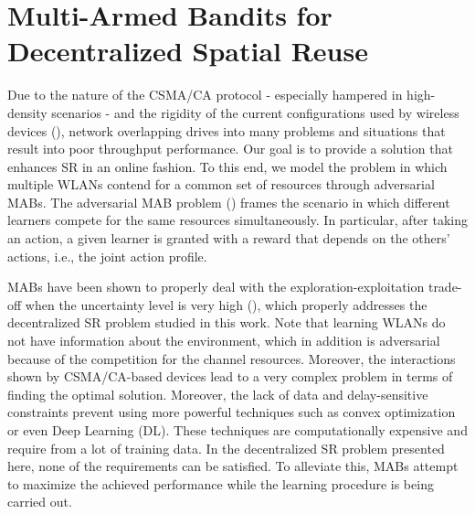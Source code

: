 \documentclass[preprint,12pt]{elsarticle}
\begin{document}
\section{Multi-Armed Bandits for Decentralized Spatial Reuse}
\label{section:mabs}
Due to the nature of the CSMA/CA protocol - especially hampered in high-density scenarios - and the rigidity of the current configurations used by wireless devices (\citealp{akella2007self}), network overlapping drives into many problems and situations that result into poor throughput performance. Our goal is to provide a solution that enhances SR in an online fashion. To this end, we model the problem in which multiple WLANs contend for a common set of resources through adversarial MABs. The adversarial MAB problem (\citealp{auer1995gambling}) frames the scenario in which different learners compete for the same resources simultaneously. In particular, after taking an action, a given learner is granted with a reward that depends on the others' actions, i.e., the joint action profile. 

MABs have been shown to properly deal with the exploration-exploitation trade-off when the uncertainty level is very high (\citealp{auer2002finite, audibert2009exploration, scott2010modern}), which properly addresses the decentralized SR problem studied in this work. Note that learning WLANs do not have information about the environment, which in addition is adversarial because of the competition for the channel resources. Moreover, the interactions shown by CSMA/CA-based devices lead to a very complex problem in terms of finding the optimal solution. Moreover, the lack of data and delay-sensitive constraints prevent using more powerful techniques such as convex optimization or even Deep Learning (DL). These techniques are computationally expensive and require from a lot of training data. In the decentralized SR problem presented here, none of the requirements can be satisfied. To alleviate this, MABs attempt to maximize the achieved performance while the learning procedure is being carried out.
\end{document}
